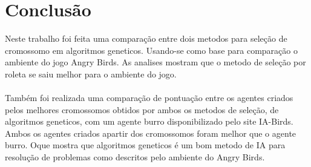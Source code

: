 \documentclass[10pt,a4paper]{article}
\begin{document}
\section{Conclusão}
Neste trabalho foi feita uma comparação entre dois metodos para seleção de cromossomo em algoritmos geneticos. Usando-se como base para comparação o ambiente do jogo Angry Birds.  As analises mostram que o metodo de seleção por roleta se saiu melhor para o ambiente do jogo. \\ \\
Também foi realizada uma comparação de pontuação entre os agentes criados pelos melhores cromossomos obtidos por ambos os metodos de seleção, de algoritmos geneticos, com um agente burro disponibilizado pelo site IA-Birds. Ambos os agentes criados apartir dos cromossomos foram melhor que o agente burro. Oque mostra que algoritmos geneticos é um bom metodo de IA para resolução de problemas como descritos pelo ambiente do Angry Birds.


\end{document}
